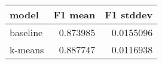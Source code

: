 \begin{tabular}{lrr}
\toprule
 model    &   F1 mean &   F1 stddev \\
\midrule
 baseline &  0.873985 &   0.0155096 \\
 k-means  &  0.887747 &   0.0116938 \\
\bottomrule
\end{tabular}